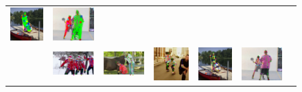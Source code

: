 \begin{figure}
\begin{tabular}{c c c c c c c}
    \includegraphics[height=0.140\linewidth]{imgidx_0210_graph_mpii_multi.pdf}&
    \includegraphics[height=0.140\linewidth]{imgidx_0697_graph_mpii_multi.pdf}\\
    &
    \includegraphics[height=0.140\linewidth]{imgidx_0075_sticks_mpii_multi.pdf}&
    \includegraphics[height=0.140\linewidth]{imgidx_1017_sticks_mpii_multi.pdf}& 
    \includegraphics[height=0.140\linewidth]{imgidx_1033_sticks_mpii_multi.pdf}&
    \includegraphics[height=0.140\linewidth]{imgidx_0210_sticks_mpii_multi.pdf}&
    \includegraphics[height=0.140\linewidth]{imgidx_0697_sticks_mpii_multi.pdf}\\


\end{tabular}
\end{figure}
